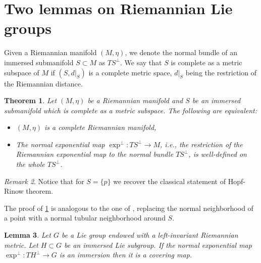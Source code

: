 \documentclass[reqno]{amsart}
\newtheorem{theorem}{Theorem}[section]
\newtheorem{lemma}[theorem]{Lemma}
\theoremstyle{remark}
\newtheorem{remark}[theorem]{Remark}
\theoremstyle{plain}
\begin{document}
\section{Two lemmas on Riemannian Lie groups}\label{4sec:Hopf-Rinow}
	Given a Riemannian manifold $(M,\eta)$, we denote the normal bundle of an immersed submanifold $S\subset M$ as $TS^{\perp}$.
We say that $S$ is complete as a metric subspace of $M$ if $(S,d|_S)$ is a complete metric space, $d|_S$ being the restriction of the Riemannian distance. 
\begin{theorem}\label{4thm:Hopf-Rinow}
    Let $(M,\eta)$ be a Riemannian manifold and $S$ be an immersed submanifold which is complete as a metric subspace. The following are equivalent:
    \begin{itemize}
        \item[i)] $(M,\eta)$ is a complete Riemannian manifold,
        \item[ii)] The normal exponential map $\exp^{\perp}:TS^\perp\to M$, i.e., the restriction of the Riemannian exponential map to the normal bundle $TS^\perp$, is well-defined on the whole $TS^\perp$.
    \end{itemize}
\end{theorem}
\begin{remark}
    Notice that for $S=\{p\}$ we recover the classical statement of Hopf-Rinow theorem.
\end{remark}
The proof of \cref{4thm:Hopf-Rinow} is analogous to the one of \cite[Thm.\ 2.8, Chap.\ 7]{DoCarmo}, replacing the normal neighborhood of a point with a normal tubular neighborhood around $S$. 
\begin{lemma}\label{4cor:groups}
    Let $G$ be a Lie group endowed with a left-invariant Riemannian metric. Let $H\subset G$ be an immersed Lie subgroup. If the normal exponential map $\exp^{\perp}:TH^\perp\to G$ is an immersion then it is a covering map.
\end{lemma}
\end{document}
